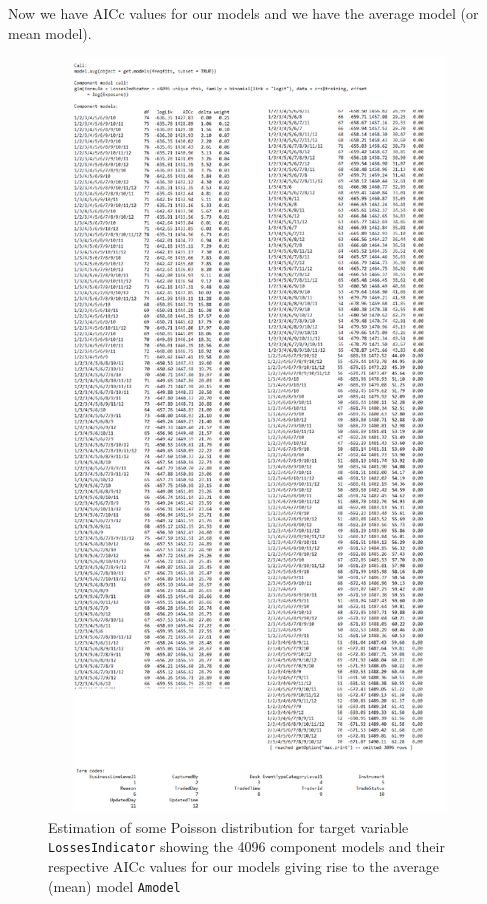 \documentclass{DissertateUSU}
\begin{document}
\normalsize

Now we have AICc values for our models and we have the average model (or
mean model).

\begin{figure}
\centering
\includegraphics[height=20cm, width=15cm]{Get_models_bin1.pdf}
\caption[Model averaging components]{Estimation of some Poisson distribution for target variable \texttt{LossesIndicator} showing the 4096 component models and their respective AICc values for our models giving rise to the average (mean) model \texttt{Amodel}}
\label{AModel_Summary1}
\end{figure}
\end{document}
